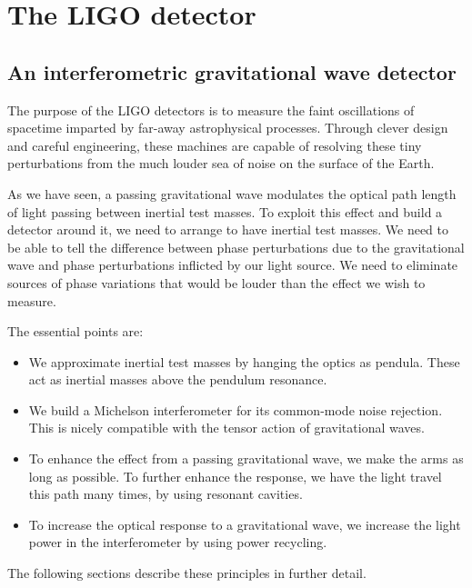 \chapter{The LIGO detector}
\label{chapter2}

\section{An interferometric gravitational wave detector}

The purpose of the LIGO detectors is to measure the faint
oscillations of spacetime imparted by far-away astrophysical
processes.  Through clever design and careful engineering, these
machines are capable of resolving these tiny perturbations from the
much louder sea of noise on the surface of the Earth\cite{Saulson1994Fundamentals}.

As we have seen, a passing gravitational wave modulates the optical
path length of light passing between inertial test
masses.  To exploit this effect and build a detector around it, we
need to arrange to have inertial test masses.  We need to be able to
tell the difference between phase perturbations due to the
gravitational wave and phase perturbations inflicted by our light
source.  We need to eliminate sources of phase variations that would
be louder than the effect we wish to measure.  

The essential points are:
\begin{itemize}
\item We approximate inertial test masses by hanging the optics as
  pendula.  These act as inertial masses above the pendulum resonance.
\item We build a Michelson interferometer for its common-mode noise
  rejection.  This is nicely compatible with the tensor action of
  gravitational waves.
\item To enhance the effect from a passing gravitational wave, we make
  the arms as long as possible.  To further enhance the response, we
  have the light travel this path many times, by using resonant cavities.
\item To increase the optical response to a gravitational wave, we
  increase the light power in the interferometer by using power
  recycling.
\end{itemize}
The following sections describe these principles in further detail.
